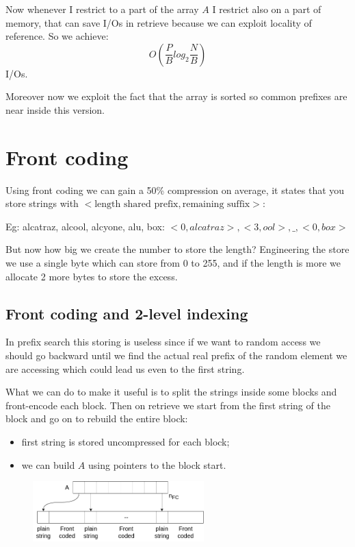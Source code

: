 Now whenever I restrict to a part of the array $A$ I restrict also on a part of memory, that can save I/Os in retrieve because we can exploit locality of reference.
So we achieve:
$$
    O \left( \frac{P}{B} log_2 \frac{N}{B} \right)
$$
I/Os.

Moreover now we exploit the fact that the array is sorted so common prefixes are near inside this version.

\section{Front coding}
Using front coding we can gain a 50\% compression on average, it states that you store strings with $< \text{length shared prefix}, \text{remaining suffix}>$:

Eg: alcatraz, alcool, alcyone, alu, box: $<0, alcatraz>, <3, ool>, \_, <0, box>$

But now how big we create the number to store the length?
Engineering the store we use a single byte which can store from 0 to 255, and if the length is more we allocate 2 more bytes to store the excess.

\subsection{Front coding and 2-level indexing}
In prefix search this storing is useless since if we want to random access we should go backward until we find the actual real prefix of the random element we are accessing which could lead us even to the first string.

What we can do to make it useful is to split the strings inside some blocks and front-encode each block.
Then on retrieve we start from the first string of the block and go on to rebuild the entire block:
\begin{itemize}
    \item first string is stored uncompressed for each block;
    \item we can build $A$ using pointers to the block start.
\end{itemize}
\begin{figure}[H]
    \centering
    \includegraphics[width=250px]{images/8_Prefix_search/prefix_search_two_level_indexing.png}
\end{figure}

